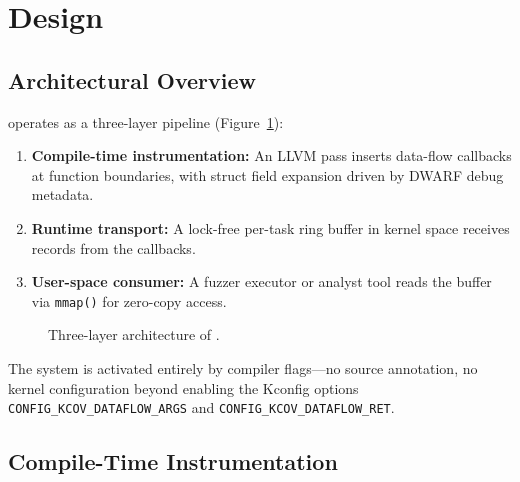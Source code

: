 \documentclass{ndss}
\begin{document}
\section{Design}\label{sec:design}

\subsection{Architectural Overview}

\toolname{} operates as a three-layer pipeline (Figure~\ref{fig:arch}):

\begin{enumerate}[nosep]
  \item \textbf{Compile-time instrumentation:} An LLVM pass inserts data-flow
        callbacks at function boundaries, with struct field expansion driven by
        DWARF debug metadata.
  \item \textbf{Runtime transport:} A lock-free per-task ring buffer in kernel
        space receives records from the callbacks.
  \item \textbf{User-space consumer:} A fuzzer executor or analyst tool reads
        the buffer via \texttt{mmap()} for zero-copy access.
\end{enumerate}

\begin{figure}[t]
\centering
{}
\caption{Three-layer architecture of \toolname{}.}\label{fig:arch}
\end{figure}

The system is activated entirely by compiler flags---no source annotation,
no kernel configuration beyond enabling the Kconfig options
\texttt{CONFIG\_KCOV\_DATAFLOW\_ARGS} and \texttt{CONFIG\_KCOV\_DATAFLOW\_RET}.

\subsection{Compile-Time Instrumentation}\label{sec:compile}
\end{document}
